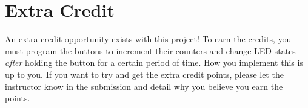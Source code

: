 \section*{Extra Credit}
An extra credit opportunity exists with this project! 
To earn the credits, you must program the buttons to increment their counters and change LED states \emph{after} holding the button for a certain period of time.
How you implement this is up to you.
If you want to try and get the extra credit points, please let the instructor know in the submission and detail why you believe you earn the points.
